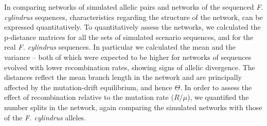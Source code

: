 In comparing networks of simulated allelic pairs and networks of the sequenced \textit{F. cylindrus} sequences, characteristics regarding the structure of the network, can be expressed quantitatively.
To quantitatively assess the networks, we calculated the p-distance matrices for all the sets of simulated scenario sequences, and for the real \textit{F. cylindrus} sequences.
In particular we calculated the mean and the variance – both of which were expected to be higher for networks of sequences evolved with lower recombination rates, showing signs of allelic divergence.
The distances reflect the mean branch length in the network and are principally affected by the mutation-drift equilibrium, and hence $\Theta$.
In order to assess the effect of recombination relative to the mutation rate ($R/\mu$), we quantified the number splits in the network, again comparing the simulated networks with those of the \textit{F. cylindrus} alleles.


